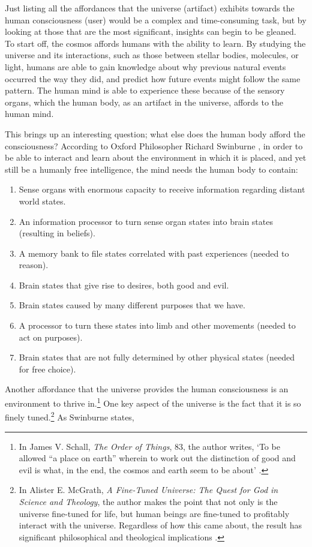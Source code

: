 Just listing all the affordances that the universe (artifact) exhibits
towards the human consciousness (user) would be a complex and
time-consuming task, but by looking at those that are the most
significant, insights can begin to be gleaned. To start off, the cosmos
affords humans with the ability to learn. By studying the universe and
its interactions, such as those between stellar bodies, molecules, or
light, humans are able to gain knowledge about why previous natural
events occurred the way they did, and predict how future events might
follow the same pattern. The human mind is able to experience these
because of the sensory organs, which the human body, as an artifact in the universe, affords to the
human mind.

This brings up an interesting question; what else does the human body
afford the consciousness? According to Oxford Philosopher Richard
Swinburne \citep[][p.~169]{swinburne2004}, in order to be able to interact and
learn about the environment in which it is placed, and yet still be a
humanly free intelligence, the mind needs the human body to contain:

\begin{enumerate}
\item Sense organs with enormous capacity to receive information regarding
distant world states.
\item An information processor to turn sense organ states into brain states
(resulting in beliefs).
\item A memory bank to file states correlated with past experiences (needed
to reason).
\item Brain states that give rise to desires, both good and evil.
\item Brain states caused by many different purposes that we have.
\item A processor to turn these states into limb and other movements
(needed to act on purposes).
\item Brain states that are not fully determined by other physical states
(needed for free choice).
\end{enumerate}

Another affordance that the universe provides the human consciousness is
an environment to thrive in.\footnote{
In James V. Schall, \textit{The Order of Things}, 83, the author writes, ‘To be
allowed “a place on earth” wherein to work out the distinction of good
and evil is what, in the end, the cosmos and earth seem to be about’ \citep[][p.~83]{schall2007}.
} One key aspect of the
universe is the fact that it is so finely tuned.\footnote{
In Alister E. McGrath, \textit{A Fine-Tuned
Universe: The Quest for God in Science and Theology}, the author makes the point that not
only is the universe fine-tuned for life, but human beings are
fine-tuned to profitably interact with the universe. Regardless of how
this came about, the result has significant philosophical and
theological implications \citep{mcgrath2009}.
} As
Swinburne states, 

